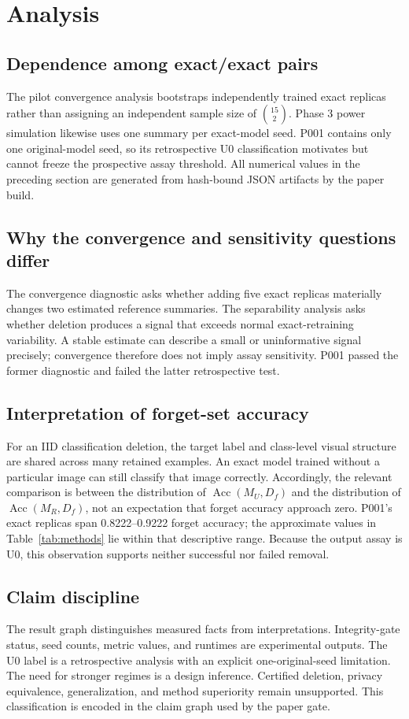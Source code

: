 \section{Analysis}
\subsection{Dependence among exact/exact pairs}
The pilot convergence analysis bootstraps independently trained exact replicas rather
than assigning an independent sample size of $\binom{15}{2}$. Phase 3 power simulation
likewise uses one summary per exact-model seed. P001 contains only one original-model
seed, so its retrospective U0 classification motivates but cannot freeze the prospective
assay threshold. All numerical values in the preceding section are generated from
hash-bound JSON artifacts by the paper build.

\subsection{Why the convergence and sensitivity questions differ}
The convergence diagnostic asks whether adding five exact replicas materially changes two
estimated reference summaries. The separability analysis asks whether deletion produces a
signal that exceeds normal exact-retraining variability. A stable estimate can describe a
small or uninformative signal precisely; convergence therefore does not imply assay
sensitivity. P001 passed the former diagnostic and failed the latter retrospective test.

\subsection{Interpretation of forget-set accuracy}
For an IID classification deletion, the target label and class-level visual structure are
shared across many retained examples. An exact model trained without a particular image
can still classify that image correctly. Accordingly, the relevant comparison is between
the distribution of $\operatorname{Acc}(M_U,D_f)$ and the distribution of
$\operatorname{Acc}(M_R,D_f)$, not an expectation that forget accuracy approach zero.
P001's exact replicas span 0.8222--0.9222 forget accuracy; the approximate values in
Table~\ref{tab:methods} lie within that descriptive range. Because the output assay is U0,
this observation supports neither successful nor failed removal.

\subsection{Claim discipline}
The result graph distinguishes measured facts from interpretations. Integrity-gate status,
seed counts, metric values, and runtimes are experimental outputs. The U0 label is a
retrospective analysis with an explicit one-original-seed limitation. The need for stronger
regimes is a design inference. Certified deletion, privacy equivalence, generalization, and
method superiority remain unsupported. This classification is encoded in the claim graph
used by the paper gate.
